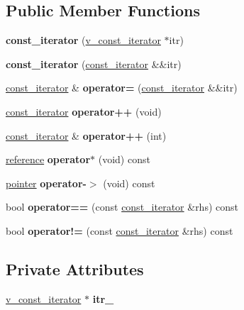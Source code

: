\subsection*{Public Member Functions}
\begin{DoxyCompactItemize}
\item 
{\bfseries const\+\_\+iterator} (\mbox{\hyperlink{class_s_m_spp__di__unipi__it_1_1_thin_var_dep_interface_1_1v__const__iterator}{v\+\_\+const\+\_\+iterator}} $\ast$itr)
\item 
{\bfseries const\+\_\+iterator} (\mbox{\hyperlink{class_s_m_spp__di__unipi__it_1_1_thin_var_dep_interface_1_1const__iterator}{const\+\_\+iterator}} \&\&itr)
\item 
\mbox{\hyperlink{class_s_m_spp__di__unipi__it_1_1_thin_var_dep_interface_1_1const__iterator}{const\+\_\+iterator}} \& {\bfseries operator=} (\mbox{\hyperlink{class_s_m_spp__di__unipi__it_1_1_thin_var_dep_interface_1_1const__iterator}{const\+\_\+iterator}} \&\&itr)
\item 
\mbox{\hyperlink{class_s_m_spp__di__unipi__it_1_1_thin_var_dep_interface_1_1const__iterator}{const\+\_\+iterator}} {\bfseries operator++} (void)
\item 
\mbox{\hyperlink{class_s_m_spp__di__unipi__it_1_1_thin_var_dep_interface_1_1const__iterator}{const\+\_\+iterator}} \& {\bfseries operator++} (int)
\item 
\mbox{\hyperlink{class_s_m_spp__di__unipi__it_1_1_variable}{reference}} {\bfseries operator$\ast$} (void) const
\item 
\mbox{\hyperlink{class_s_m_spp__di__unipi__it_1_1_variable}{pointer}} {\bfseries operator-\/$>$} (void) const
\item 
bool {\bfseries operator==} (const \mbox{\hyperlink{class_s_m_spp__di__unipi__it_1_1_thin_var_dep_interface_1_1const__iterator}{const\+\_\+iterator}} \&rhs) const
\item 
bool {\bfseries operator!=} (const \mbox{\hyperlink{class_s_m_spp__di__unipi__it_1_1_thin_var_dep_interface_1_1const__iterator}{const\+\_\+iterator}} \&rhs) const
\end{DoxyCompactItemize}
\subsection*{Private Attributes}
\begin{DoxyCompactItemize}
\item 
\mbox{\hyperlink{class_s_m_spp__di__unipi__it_1_1_thin_var_dep_interface_1_1v__const__iterator}{v\+\_\+const\+\_\+iterator}} $\ast$ {\bfseries itr\+\_\+}
\end{DoxyCompactItemize}


